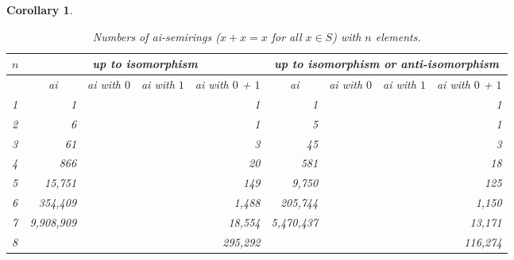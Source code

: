 \documentclass{article}
\theoremstyle{definition}
\theoremstyle{plain}
\newtheorem{cor}[defn]{Corollary}
\begin{document}
\begin{cor}
\begin{table}[ht]
  \centering
  \begin{tabular}{l|r|r|r|r|r|r|r|r}
    $n$
    & \multicolumn{4}{c|}{up to isomorphism}
    & \multicolumn{4}{c}{up to isomorphism or anti-isomorphism} \\
    \midrule
    & \multicolumn{1}{c|}{ai} & \multicolumn{1}{c|}{ai with $0$}
    & \multicolumn{1}{c|}{ai with $1$} & \multicolumn{1}{c|}{ai with $0$ + $1$}
    & \multicolumn{1}{c|}{ai} & \multicolumn{1}{c}{ai with $0$}
    & \multicolumn{1}{c|}{ai with $1$} & \multicolumn{1}{c|}{ai with $0$ + $1$}
    \\
    \midrule
    1 & 1             & &&1       & 1          & && 1      \\
    2 & 6             & &&1       & 5          & && 1      \\
    3 & 61            & &&3       & 45         & && 3      \\
    4 & 866           & &&20      & 581        & && 18     \\
    5 & 15,751        & &&149     & 9,750      & && 125    \\
    6 & 354,409       & &&1,488   & 205,744    & && 1,150  \\
    7 & 9,908,909     & &&18,554  & 5,470,437  & && 13,171 \\
    8 &               &           &&295,292 &  & && 116,274
  \end{tabular}
  \caption{Numbers of ai-semirings ($x + x = x$ for all $x\in S$) with $n$
  elements.}
  \label{tab:ai-semirings}
\end{table}


\end{cor}
\end{document}
